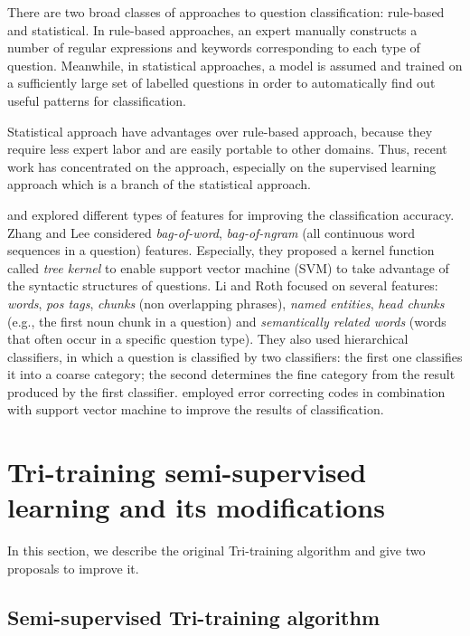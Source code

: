 \documentclass[english]{jnlp_1.4}
\begin{document}
There are two broad classes of approaches to question classification: rule-based and statistical. In rule-based approaches, an expert manually constructs a number of regular expressions and keywords corresponding to each type of question. Meanwhile, in statistical approaches, a model is assumed and trained on a sufficiently large set of labelled questions in order to automatically find out useful patterns for classification.

Statistical approach have advantages over rule-based approach, because they require less expert labor and are easily portable to other domains.  Thus, recent work has concentrated on the approach, especially on the supervised learning approach which is a branch of the statistical approach.

\cite{Dell03} and \cite{Li02} explored different types of features
for improving the classification accuracy. Zhang and Lee
considered \emph{bag-of-word}, \emph{bag-of-ngram} (all continuous
word sequences in a question) features. Especially, they proposed
a kernel function called \emph{tree kernel} to enable support
vector machine (SVM) to take advantage of the syntactic structures
of questions. Li and Roth focused on several features:
\emph{words}, \emph{pos tags}, \emph{chunks} (non overlapping
phrases), \emph{named entities}, \emph{head chunks} (e.g., the
first noun chunk in a question) and \emph{semantically related
words} (words that often occur in a specific question type). They
also used hierarchical classifiers, in which a question is
classified by two classifiers: the first one classifies it into a
coarse category; the second determines the fine category from the
result produced by the first classifier. \cite{Hacioglu03}
employed error correcting codes in combination with support vector
machine to improve the results of classification.


\section{Tri-training semi-supervised learning and its modifications}

In this section, we describe the original Tri-training algorithm and give two proposals to improve it.

\subsection{Semi-supervised Tri-training algorithm}
\end{document}
